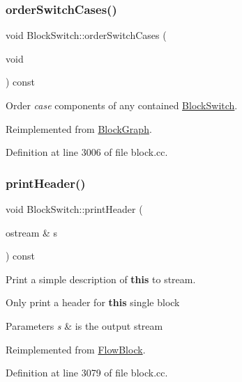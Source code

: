 \subsubsection{\texorpdfstring{orderSwitchCases()}{orderSwitchCases()}}
{\footnotesize\ttfamily void Block\+Switch\+::order\+Switch\+Cases (\begin{DoxyParamCaption}\item[{void}]{ }\end{DoxyParamCaption}) const\hspace{0.3cm}{\ttfamily [virtual]}}



Order {\itshape case} components of any contained \mbox{\hyperlink{class_block_switch}{Block\+Switch}}. 



Reimplemented from \mbox{\hyperlink{class_block_graph_aaab258bf71213db644bb8e1764f81b1f}{Block\+Graph}}.



Definition at line 3006 of file block.\+cc.

\mbox{\label{class_block_switch_a57143ab3d1cea8c6962bdcf52fbe4bdf}} 
\subsubsection{\texorpdfstring{printHeader()}{printHeader()}}
{\footnotesize\ttfamily void Block\+Switch\+::print\+Header (\begin{DoxyParamCaption}\item[{ostream \&}]{s }\end{DoxyParamCaption}) const\hspace{0.3cm}{\ttfamily [virtual]}}



Print a simple description of {\bfseries{this}} to stream. 

Only print a header for {\bfseries{this}} single block 
\begin{DoxyParams}{Parameters}
{\em s} & is the output stream \\
\hline
\end{DoxyParams}


Reimplemented from \mbox{\hyperlink{class_flow_block_a0d19c5b80186cf289dfbe0ce9e3ce37a}{Flow\+Block}}.



Definition at line 3079 of file block.\+cc.

